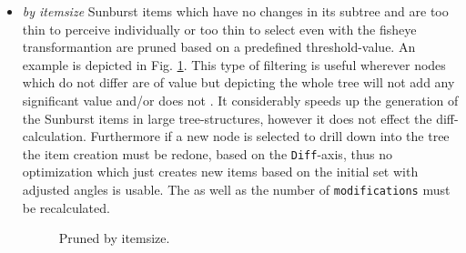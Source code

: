 \begin{itemize}
\item \emph{by itemsize} Sunburst items which have no changes in its subtree and are too thin to perceive individually or too thin to select even with the fisheye transformantion are pruned based on a predefined threshold-value. An example is depicted in Fig. \ref{fig:pruned-by-itemsize}. This type of filtering is useful wherever nodes which do not differ are of value but depicting the whole tree will not add any significant value and/or does not . It considerably speeds up the generation of the Sunburst items in large tree-structures, however it does not effect the diff-calculation. Furthermore if a new node is selected to drill down into the tree the item creation must be redone, based on the \texttt{Diff}-axis, thus no optimization which just creates new items based on the initial set with adjusted angles is usable. The  as well as the number of \texttt{modifications} must be recalculated. 

\begin{figure}[tb]
\caption{\label{fig:pruned-by-itemsize} Pruned by itemsize.}
\end{figure}


\end{itemize}
